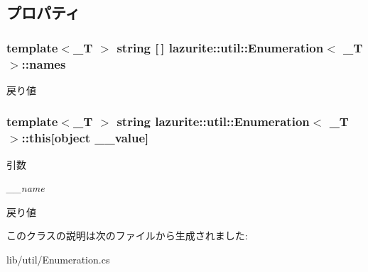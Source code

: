\subsection{プロパティ}
\hypertarget{classlazurite_1_1util_1_1_enumeration_3_01___t_01_4_a1070121853e1e0a2dfb1c8202e466a87}{
\subsubsection[{names}]{\setlength{\rightskip}{0pt plus 5cm}template$<$\_\-T $>$ string \mbox{[}$\,$\mbox{]} lazurite::util::Enumeration$<$ \_\-T $>$::names}}
\label{classlazurite_1_1util_1_1_enumeration_3_01___t_01_4_a1070121853e1e0a2dfb1c8202e466a87}
\begin{DoxyReturn}{戻り値}

\end{DoxyReturn}
\hypertarget{classlazurite_1_1util_1_1_enumeration_3_01___t_01_4_a3821704b716830abfc16bef341196cab}{
\subsubsection[{this}]{\setlength{\rightskip}{0pt plus 5cm}template$<$\_\-T $>$ string lazurite::util::Enumeration$<$ \_\-T $>$::this\mbox{[}object \_\-\_\-value\mbox{]}}}
\label{classlazurite_1_1util_1_1_enumeration_3_01___t_01_4_a3821704b716830abfc16bef341196cab}

\begin{DoxyParams}{引数}
\item[{\em \_\-\_\-name}]\end{DoxyParams}
\begin{DoxyReturn}{戻り値}

\end{DoxyReturn}


このクラスの説明は次のファイルから生成されました:\begin{DoxyCompactItemize}
\item 
lib/util/Enumeration.cs\end{DoxyCompactItemize}
